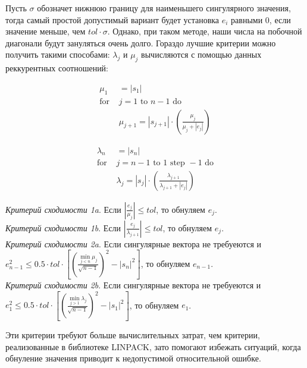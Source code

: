 \documentclass[12pt, a4paper]{report}
\theoremstyle{note}
\begin{document}
Пусть $\sigma$ обозначет нижнюю границу для наименьшего сингулярного значения, тогда самый простой допустимый вариант будет установка $e_i$ равными 0, если значение меньше, чем $tol\cdot\sigma$. Однако, при таком методе, наши числа на побочной диагонали будут зануляться очень долго. Гораздо лучшие критерии можно получить такими способами:
 $\lambda_j$ и $\mu_j$ вычисляются с помощью данных реккурентных соотношений:

\begin{minipage}{0.48\textwidth}
\begin{align*}
\mu_1& = |s_1| \\
\text{for }& j = 1 \text{ to } n-1 \text{ do} \\
&\mu_{j+1} = |s_{j+1}| \cdot \left( \frac{\mu_j}{\mu_j + |e_j|} \right)
\end{align*}
\end{minipage}
\hfill
\begin{minipage}{0.48\textwidth}
\begin{align*}
\lambda_n& = |s_n| \\
\text{for }& j = n-1 \text{ to } 1 \text{ step } -1 \text{ do} \\
&\lambda_j = |s_j| \cdot \left( \frac{\lambda_{j+1}}{\lambda_{j+1} + |e_j|} \right)
\end{align*}
\end{minipage}
\vspace{1em}

\noindent\textit{Критерий сходимости 1a}. Если $|\frac{e_j}{\mu_j}|\leq tol$, то обнуляем $e_j$.\vspace{1em}
\\\textit{Критерий сходимости 1b}. Если $|\frac{e_j}{\lambda_{j+1}}|\leq tol$, то обнуляем $e_j$.\vspace{1em}
\\\textit{Критерий сходимости 2a}. Если сингулярные вектора не требуеются и\linebreak $e^2_{n-1}\leq0.5\cdot tol\cdot [(\frac{\min\limits_{j<n}\mu_j}{\sqrt{n-1}})^2-|s_n|^2]$, то обнуляем $e_{n-1}$.\vspace{1em}
\\\textit{Критерий сходимости 2b}. Если сингулярные вектора не требуеются и\linebreak $e^2_1\leq0.5\cdot tol\cdot [(\frac{\min\limits_{j>1}\lambda_j}{\sqrt{n-1}})^2-|s_1|^2]$, то обнуляем $e_1$.\vspace{1em}

Эти критерии требуют больше вычислительных затрат, чем критерии, реализованные в библиотеке LINPACK, зато помогают избежать ситуаций, когда обнуление значения приводит к недопустимой относительной ошибке.
\end{document}
